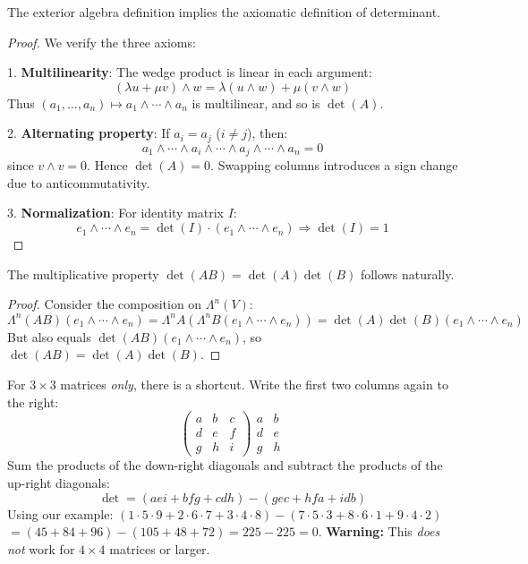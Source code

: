 \begin{theorem}
The exterior algebra definition implies the axiomatic definition of determinant.
\end{theorem}

\begin{proof}
We verify the three axioms:

1. \textbf{Multilinearity}: The wedge product is linear in each argument:
\[
(\lambda u + \mu v) \wedge w = \lambda(u \wedge w) + \mu(v \wedge w)
\]
Thus $(a_1, \ldots, a_n) \mapsto a_1 \wedge \cdots \wedge a_n$ is multilinear, and so is $\det(A)$.

2. \textbf{Alternating property}: If $a_i = a_j$ ($i \neq j$), then:
\[
a_1 \wedge \cdots \wedge a_i \wedge \cdots \wedge a_j \wedge \cdots \wedge a_n = 0
\]
since $v \wedge v = 0$. Hence $\det(A) = 0$. Swapping columns introduces a sign change due to anticommutativity.

3. \textbf{Normalization}: For identity matrix $I$:
\[
e_1 \wedge \cdots \wedge e_n = \det(I) \cdot (e_1 \wedge \cdots \wedge e_n) \Rightarrow \det(I) = 1
\]
\end{proof}

\begin{corollary}
The multiplicative property $\det(AB) = \det(A)\det(B)$ follows naturally.
\end{corollary}

\begin{proof}
Consider the composition on $\Lambda^n(V)$:
\[
\Lambda^n(AB)(e_1 \wedge \cdots \wedge e_n) = \Lambda^nA(\Lambda^nB(e_1 \wedge \cdots \wedge e_n)) = \det(A)\det(B)(e_1 \wedge \cdots \wedge e_n)
\]
But also equals $\det(AB)(e_1 \wedge \cdots \wedge e_n)$, so $\det(AB) = \det(A)\det(B)$.
\end{proof}

\begin{remark}
For $3 \times 3$ matrices \emph{only}, there is a shortcut.
% 
Write the first two columns again to the right:
\[
\begin{pmatrix} a & b & c \\ d & e & f \\ g & h & i \end{pmatrix}
\begin{matrix} a & b \\ d & e \\ g & h \end{matrix}
\]
Sum the products of the down-right diagonals and subtract the products of the up-right diagonals:
\[ \det = (aei + bfg + cdh) - (gec + hfa + idb) \]
Using our example:
$(1\cdot 5\cdot 9 + 2\cdot 6\cdot 7 + 3\cdot 4\cdot 8) - (7\cdot 5\cdot 3 + 8\cdot 6\cdot 1 + 9\cdot 4\cdot 2)$
$= (45 + 84 + 96) - (105 + 48 + 72) = 225 - 225 = 0$.
\textbf{Warning:} This \emph{does not} work for $4\times 4$ matrices or larger.
\end{remark}


